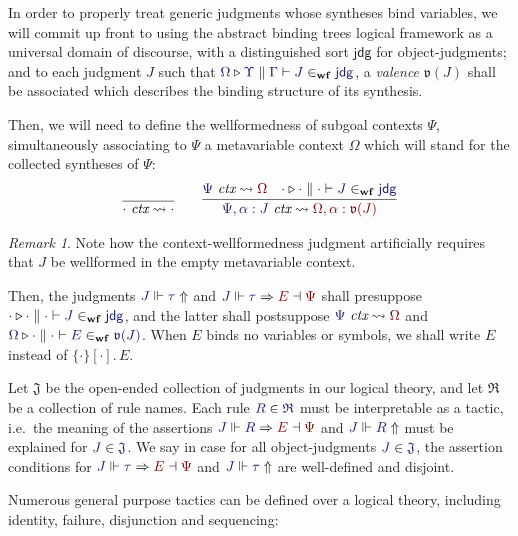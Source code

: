 \documentclass[11pt]{article}
\theoremstyle{definition}
\theoremstyle{remark}
\newtheorem{remark}[thm]{Remark}
\numberwithin{equation}{section}
\def\IModeColorName{MidnightBlue}
\def\OModeColorName{Maroon}
\newcommand\IMode[1]{{\color{\IModeColorName}{#1}}}
\newcommand\OMode[1]{{\color{\OModeColorName}{#1}}}
\newcommand\JJ{J}
\newcommand\RSet{\mathfrak{R}}
\newcommand\JSet{\mathfrak{J}}
\newcommand\IsTac[1]{\IMode{#1}\ \textit{tactic}}
\newcommand\IsWf[5]{%
  \IMode{#1}\triangleright%
  \IMode{#2}\parallel%
  \IMode{#3}\vdash%
  \IMode{#4}\in_{\mathbf{wf}}\IMode{#5}%
}
\newcommand\IsCtx[2]{
  \IMode{#1}\ \textit{ctx}\leadsto \OMode{#2}
}
\newcommand\SortJdg{\mathsf{jdg}}
\newcommand\MkBTm[3]{\{#1\}[#2].\, #3}
\newcommand\JdgValence[1]{\mathfrak{v}(#1)}
\newcommand\Refine[4]{\IMode{#1}\Vdash\IMode{#2}\Rightarrow\OMode{#4}\dashv\OMode{#3}}
\newcommand\NoRefine[2]{\IMode{#1}\Vdash\IMode{#2}\Uparrow}
\newcommand\Member[2]{\IMode{#1}\in\IMode{#2}}
\begin{document}
In order to properly treat generic judgments whose syntheses bind variables, we
will commit up front to using the abstract binding trees logical framework as a
universal domain of discourse, with a distinguished sort $\SortJdg$ for
object-judgments; and to each judgment $\JJ$ such that
$\IsWf{\Omega}{\Upsilon}{\Gamma}{\JJ}{\SortJdg}$, a \emph{valence}
$\JdgValence{\JJ}$ shall be associated which describes the binding structure of
its synthesis.

Then, we will need to define the wellformedness of subgoal contexts $\Psi$,
simultaneously associating to $\Psi$ a metavariable context $\Omega$ which will
stand for the collected syntheses of $\Psi$:
\begin{gather*}
  \infer{
    \IsCtx{\cdot}{\cdot}
  }{
  }\qquad
  \infer{
    \IsCtx{\Psi,\alpha:\JJ}{\Omega,\alpha:\JdgValence{\JJ}}
  }{
    \IsCtx{\Psi}{\Omega} &
    \IsWf{\cdot}{\cdot}{\cdot}{\JJ}{\SortJdg}
  }
\end{gather*}

\begin{remark}
  Note how the context-wellformedness judgment artificially requires that $\JJ$
  be wellformed in the empty metavariable context.
\end{remark}

Then, the judgments $\NoRefine{\JJ}{\tau}$ and $\Refine{\JJ}{\tau}{\Psi}{E}$
shall presuppose $\IsWf{\cdot}{\cdot}{\cdot}{\JJ}{\SortJdg}$, and the latter
shall postsuppose $\IsCtx{\Psi}{\Omega}$ and $\IsWf{\Omega}{\cdot}{\cdot}{E}{\JdgValence{\JJ}}$.
When $E$ binds no variables or symbols, we shall write $E$ instead of
$\MkBTm{\cdot}{\cdot}{E}$.

Let $\JSet$ be the open-ended collection of judgments in our logical theory,
and let $\RSet$ be a collection of rule names. Each rule $\Member{R}{\RSet}$
must be interpretable as a tactic, i.e.\ the meaning of the assertions
$\Refine{\JJ}{R}{\Psi}{E}$ and $\NoRefine{\JJ}{R}$ must be explained for
$\Member{J}{\JSet}$. We say \framebox{$\IsTac{\tau}$} in case for all
object-judgments $\Member{\JJ}{\JSet}$, the assertion conditions for
$\Refine{\JJ}{\tau}{\Psi}{E}$ and $\NoRefine{\JJ}{\tau}$ are well-defined and
disjoint.

Numerous general purpose tactics can be defined over a logical theory,
including identity, failure, disjunction and sequencing:
\end{document}
